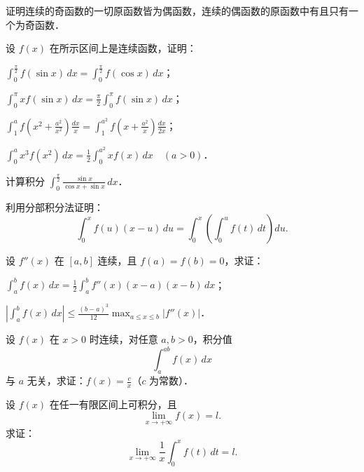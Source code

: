 \begin{xiti}
\item 证明连续的奇函数的一切原函数皆为偶函数，连续的偶函数的原函数中有且只有一个为奇函数．

\item 设 $f(x)$ 在所示区间上是连续函数，证明：
\begin{ziti}
\item $\displaystyle \int_0^{\frac{\pi}{2}} f(\sin x)\,dx = \int_0^{\frac{\pi}{2}} f(\cos x)\,dx$；
\item $\displaystyle \int_0^\pi x f(\sin x)\,dx = \frac{\pi}{2}\int_0^\pi f(\sin x)\,dx$；
\item $\displaystyle \int_1^a f\left(x^2 + \frac{a^2}{x^2}\right)\frac{dx}{x} = \int_1^{a^2} f\left(x + \frac{a^2}{x}\right)\frac{dx}{2x}$；
\item $\displaystyle \int_0^a x^3 f(x^2)\,dx = \frac{1}{2}\int_0^{a^2} x f(x)\,dx \quad (a > 0)$．
\end{ziti}

\item 计算积分 $\displaystyle \int_0^{\frac{\pi}{2}}\frac{\sin x}{\cos x + \sin x}\,dx$．

\item 利用分部积分法证明：
\[
\int_0^x f(u)(x - u)\,du = \int_0^x \left(\int_0^u f(t)\,dt\right)du.
\]

\item 设 $f''(x)$ 在 $[a,b]$ 连续，且 $f(a) = f(b) = 0$，求证：
\begin{ziti}
\item $\displaystyle \int_a^b f(x)\,dx = \frac{1}{2}\int_a^b f''(x)(x - a)(x - b)\,dx$；
\item $\displaystyle \left|\int_a^b f(x)\,dx\right| \leqslant \frac{(b - a)^3}{12}\max_{a \leqslant x \leqslant b}|f''(x)|$．
\end{ziti}

\item 设 $f(x)$ 在 $x > 0$ 时连续，对任意 $a, b > 0$，积分值
\[
\int_a^{ab} f(x)\,dx
\]
与 $a$ 无关，求证：$f(x) = \frac{c}{x}$（$c$ 为常数）．

\item 设 $f(x)$ 在任一有限区间上可积分，且
\[
\lim_{x \to +\infty}f(x) = l.
\]
求证：
\[
\lim_{x \to +\infty}\frac{1}{x}\int_0^x f(t)\,dt = l.
\]
\end{xiti}
